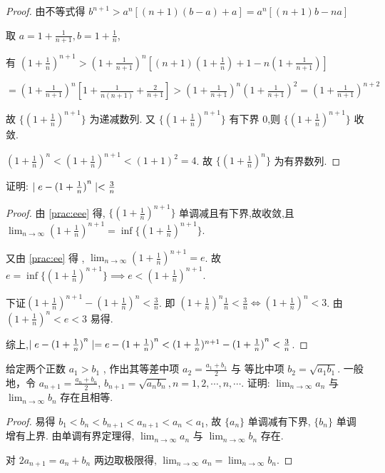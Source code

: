 \begin{proof}
    由不等式得 $b^{n+1}>a^n[(n+1)(b-a)+a]=a^n[(n+1)b-na]$

    取 $a=1+\frac{1}{n+1},b=1+\frac{1}{n}$,

    有 $(1+\frac{1}{n})^{n+1}>(1+\frac{1}{n+1})^n[(n+1)(1+\frac{1}{n})+1-n(1+\frac{1}{n+1})]$
    
    $=(1+\frac{1}{n+1})^n[1+\frac{1}{n(n+1)}+\frac{2}{n+1}]>(1+\frac{1}{n+1})^n(1+\frac{1}{n+1})^2=(1+\frac{1}{n+1})^{n+2}$

    故 $\{(1+\frac{1}{n})^{n+1}\}$ 为递减数列. 又 $\{(1+\frac{1}{n})^{n+1}\}$ 有下界 0,则 $\{(1+\frac{1}{n})^{n+1}\}$ 收敛.

    $(1+\frac{1}{n})^n<(1+\frac{1}{n})^{n+1}<(1+1)^2=4$. 故 $\{(1+\frac{1}{n})^n\}$ 为有界数列.
\end{proof}

\begin{practice}
    证明: $\mid e-{(1+\frac{1}{n})}^n \mid<\frac{3}{n}$
\end{practice}

\begin{proof}
    由 \ref{prac:eee} 得, $\{(1+\frac{1}{n})^{n+1}\}$ 单调减且有下界,故收敛,且 $\lim_{n\to\infty} (1+\frac{1}{n})^{n+1}=\inf\{ (1+\frac{1}{n})^{n+1}\}$.

    又由 \ref{prac:ee} 得 , $\lim_{n\to\infty} (1+\frac{1}{n})^{n+1}=e$. 故 $e=\inf\{ (1+\frac{1}{n})^{n+1}\}\implies e< (1+\frac{1}{n})^{n+1}$.

    下证$(1+\frac{1}{n})^{n+1}-{(1+\frac{1}{n})}^n<\frac{3}{n}$. 即 $(1+\frac{1}{n})^{n}\frac{1}{n}<\frac{3}{n}\iff (1+\frac{1}{n})^{n}<3$. 由 $(1+\frac{1}{n})^{n}<e<3$ 易得.

    综上,$\mid e-{(1+\frac{1}{n})}^n \mid=e-{(1+\frac{1}{n})}^n<(1+\frac{1}{n})^{n+1}-{(1+\frac{1}{n})}^n<\frac{3}{n}$.
\end{proof}

\begin{practice}
    给定两个正数 $a_1>b_1$ , 作出其等差中项 $a_2=\frac{a_1+b_1}{2}$ 与 等比中项 $b_2=\sqrt{a_1b_1}$. 一般地，令 $a_{n+1}=\frac{a_n+b_n}{2}$, $b_{n+1}=\sqrt{a_nb_n},n=1,2,\cdots,n,\cdots$.
    证明: $\lim_{n\to\infty} a_n$ 与 $\lim_{n\to\infty} b_n$  存在且相等.
\end{practice}

\begin{proof}
    易得 $b_1<b_{n}<b_{n+1}<a_{n+1}<a_n<a_1$, 故 $\{a_n\}$ 单调减有下界, $\{b_n\}$ 单调增有上界. 由单调有界定理得, $\lim_{n\to\infty} a_n$ 与 $\lim_{n\to\infty} b_n$  存在. 

    对 $2a_{n+1}=a_n+b_n$ 两边取极限得, $\lim_{n\to\infty} a_n=\lim_{n\to\infty} b_n$.
\end{proof}

